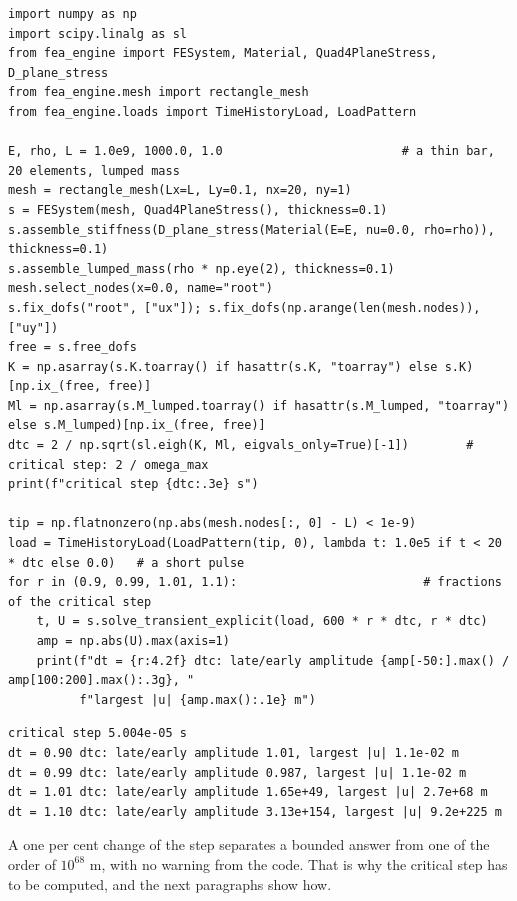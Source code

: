 \begin{lstlisting}[caption={Central differences on a lumped-mass bar at fractions of the critical step (run with the package on the path).},label={lst:dy-try}]
import numpy as np
import scipy.linalg as sl
from fea_engine import FESystem, Material, Quad4PlaneStress, D_plane_stress
from fea_engine.mesh import rectangle_mesh
from fea_engine.loads import TimeHistoryLoad, LoadPattern

E, rho, L = 1.0e9, 1000.0, 1.0                         # a thin bar, 20 elements, lumped mass
mesh = rectangle_mesh(Lx=L, Ly=0.1, nx=20, ny=1)
s = FESystem(mesh, Quad4PlaneStress(), thickness=0.1)
s.assemble_stiffness(D_plane_stress(Material(E=E, nu=0.0, rho=rho)), thickness=0.1)
s.assemble_lumped_mass(rho * np.eye(2), thickness=0.1)
mesh.select_nodes(x=0.0, name="root")
s.fix_dofs("root", ["ux"]); s.fix_dofs(np.arange(len(mesh.nodes)), ["uy"])
free = s.free_dofs
K = np.asarray(s.K.toarray() if hasattr(s.K, "toarray") else s.K)[np.ix_(free, free)]
Ml = np.asarray(s.M_lumped.toarray() if hasattr(s.M_lumped, "toarray") else s.M_lumped)[np.ix_(free, free)]
dtc = 2 / np.sqrt(sl.eigh(K, Ml, eigvals_only=True)[-1])        # critical step: 2 / omega_max
print(f"critical step {dtc:.3e} s")

tip = np.flatnonzero(np.abs(mesh.nodes[:, 0] - L) < 1e-9)
load = TimeHistoryLoad(LoadPattern(tip, 0), lambda t: 1.0e5 if t < 20 * dtc else 0.0)   # a short pulse
for r in (0.9, 0.99, 1.01, 1.1):                          # fractions of the critical step
    t, U = s.solve_transient_explicit(load, 600 * r * dtc, r * dtc)
    amp = np.abs(U).max(axis=1)
    print(f"dt = {r:4.2f} dtc: late/early amplitude {amp[-50:].max() / amp[100:200].max():.3g}, "
          f"largest |u| {amp.max():.1e} m")
\end{lstlisting}

\begin{lstlisting}[numbers=none,language={},keywordstyle={},commentstyle={},frame=single,aboveskip=2pt]
critical step 5.004e-05 s
dt = 0.90 dtc: late/early amplitude 1.01, largest |u| 1.1e-02 m
dt = 0.99 dtc: late/early amplitude 0.987, largest |u| 1.1e-02 m
dt = 1.01 dtc: late/early amplitude 1.65e+49, largest |u| 2.7e+68 m
dt = 1.10 dtc: late/early amplitude 3.13e+154, largest |u| 9.2e+225 m
\end{lstlisting}

A one per cent change of the step separates a bounded answer from one of the order of $10^{68}$ m, with no warning from the code. That is why the critical step has to be computed, and the next paragraphs show how.

